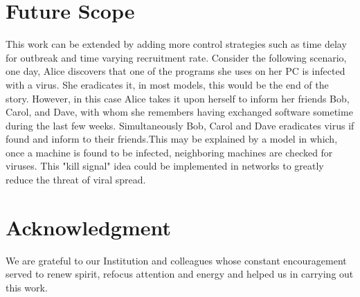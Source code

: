 \documentclass[conference]{IEEEtran}
\begin{document}
\section{Future Scope}
This work can be extended by adding more control strategies such as time delay for outbreak and time varying recruitment rate. Consider the following scenario, one day, Alice discovers that one of the programs she uses on her PC is infected with a virus. She eradicates it, in most models, this would be the end of the story. However, in this case Alice takes it upon herself to inform her friends Bob, Carol, and Dave, with whom she remembers having exchanged software sometime during the last few weeks. Simultaneously Bob, Carol and Dave eradicates virus if found and inform to their friends.This may be explained by a model in which, once a machine is found to be infected, neighboring machines are checked for viruses. This "kill signal" idea could be implemented in networks to greatly reduce the threat of viral spread\cite{kephart1993computers}. \\

\section*{Acknowledgment}
We are grateful to our Institution and colleagues whose constant encouragement served to renew spirit, refocus attention and energy and helped us in carrying out this work.



\end{document}
